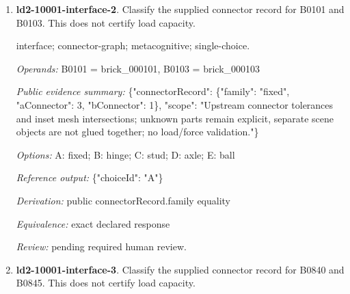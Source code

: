 \begin{enumerate}
\par{\small interface; connector-graph; metacognitive; single-choice.\par\textit{Operands:} B0477 = brick\_000477, B0476 = brick\_000476\par\textit{Public evidence summary:} \{"connectorRecord": \{"family": "axle", "aConnector": 0, "bConnector": 0\}, "scope": "Upstream connector tolerances and inset mesh intersections; unknown parts remain explicit, separate scene objects are not glued together; no load/force validation."\}\par\textit{Options:} A: hinge; B: ball; C: fixed; D: stud; E: axle\par\textit{Reference output:} \{"choiceId": "E"\}\par\textit{Derivation:} public connectorRecord.family equality\par\textit{Equivalence:} exact declared response\par\textit{Review:} machine checks passed; no human certification.}
\item \textbf{ld2-10001-interface-2}. Classify the supplied connector record for B0101 and B0103. This does not certify load capacity.
\par{\small interface; connector-graph; metacognitive; single-choice.\par\textit{Operands:} B0101 = brick\_000101, B0103 = brick\_000103\par\textit{Public evidence summary:} \{"connectorRecord": \{"family": "fixed", "aConnector": 3, "bConnector": 1\}, "scope": "Upstream connector tolerances and inset mesh intersections; unknown parts remain explicit, separate scene objects are not glued together; no load/force validation."\}\par\textit{Options:} A: fixed; B: hinge; C: stud; D: axle; E: ball\par\textit{Reference output:} \{"choiceId": "A"\}\par\textit{Derivation:} public connectorRecord.family equality\par\textit{Equivalence:} exact declared response\par\textit{Review:} pending required human review.}
\item \textbf{ld2-10001-interface-3}. Classify the supplied connector record for B0840 and B0845. This does not certify load capacity.

\end{enumerate}

